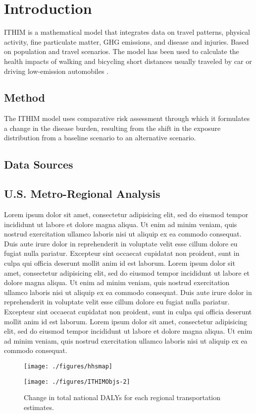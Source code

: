 \documentclass{bioinfo}
\begin{document}
\section{Introduction}

ITHIM is a mathematical model that integrates data on travel patterns,
physical activity, fine particulate matter, GHG emissions, and disease
and injuries. Based on population and travel scenarios. The model has
been used to calculate the health impacts of walking and bicycling
short distances usually traveled by car or driving low-emission
automobiles \cite{woodcock2013,maizlish2013}.



\begin{methods}
\section{Method}

The ITHIM model uses comparative risk assessment through which it
formulates a change in the disease burden, resulting from the shift in
the exposure distribution from a baseline scenario to an alternative
scenario.

\subsection{Data Sources}

\subsection{U.S. Metro-Regional Analysis}

Lorem ipsum dolor sit amet, consectetur adipisicing elit, sed do
eiusmod tempor incididunt ut labore et dolore magna aliqua. Ut enim ad
minim veniam, quis nostrud exercitation ullamco laboris nisi ut
aliquip ex ea commodo consequat. Duis aute irure dolor in
reprehenderit in voluptate velit esse cillum dolore eu fugiat nulla
pariatur. Excepteur sint occaecat cupidatat non proident, sunt in
culpa qui officia deserunt mollit anim id est laborum. Lorem ipsum
dolor sit amet, consectetur adipisicing elit, sed do eiusmod tempor
incididunt ut labore et dolore magna aliqua. Ut enim ad minim veniam,
quis nostrud exercitation ullamco laboris nisi ut aliquip ex ea
commodo consequat. Duis aute irure dolor in reprehenderit in voluptate
velit esse cillum dolore eu fugiat nulla pariatur. Excepteur sint
occaecat cupidatat non proident, sunt in culpa qui officia deserunt
mollit anim id est laborum. Lorem ipsum dolor sit amet, consectetur
adipisicing elit, sed do eiusmod tempor incididunt ut labore et dolore
magna aliqua. Ut enim ad minim veniam, quis nostrud exercitation
ullamco laboris nisi ut aliquip ex ea commodo consequat.


\begin{figure}[t]
    \centerline{\texttt{[image: ./figures/hhsmap]}}\centerline{\texttt{[image: ./figures/ITHIMObjs-2]}}
    \caption{Change in total national DALYs for each regional transportation
estimates.
}\label{dalyFigure}
\end{figure}
\end{methods}
\end{document}
